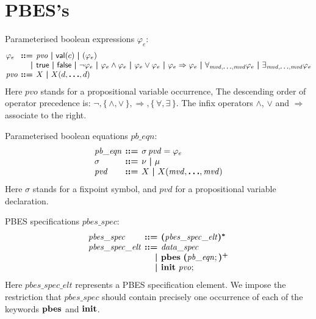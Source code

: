 \documentclass[a4paper,fleqn,10pt]{article}
\makeatletter
\newcommand{\f}[1]{\ensuremath{\mathit{#1}}}
\newenvironment{tightarray}[1]
  {\setlength{\arraycolsep}{2pt}%
   \begin{array}{@{}#1@{}}%
  }
  {\end{array}%
  }
\newcommand{\set}[1]{\ensuremath{\{\,#1\,\}}}
\newcommand{\limp}{\ensuremath{\Rightarrow}}
\newcommand{\mb}[1]{\text{\boldmath$#1$}}
\newcommand{\kwinit}{{\bf init}}
\newcommand{\kwpbes}{{\bf pbes}}
\makeatother
\begin{document}
\section{PBES's}

Parameterised boolean expressions $\varphi_e$:
\[\begin{tightarray}{lrl}
\varphi_e & \mb{::=} & \f{pvo}\ \mb{|}\
                       \mathsf{val}(c)\ \mb{|}\
                       ( \varphi_e )\\
          & \mb{|}   & \mathsf{true}\ \mb{|}\
                       \mathsf{false}\ \mb{|}\
                       \neg \varphi_e\ \mb{|}\
                       \varphi_e \land \varphi_e\ \mb{|}\
                       \varphi_e \lor \varphi_e\ \mb{|}\
                       \varphi_e \limp \varphi_e\ \mb{|}\
                       \forall_{\f{mvd},\mb{\ldots},\f{mvd}} \varphi_e\ \mb{|}\
                       \exists_{\f{mvd},\mb{\ldots},\f{mvd}} \varphi_e\\
\f{pvo}  & \mb{::=} & X\ \mb{|}\ X(d,\mb{\ldots},d)\\
\end{tightarray}\]
Here $\f{pvo}$ stands for a propositional variable occurrence,
The descending order of operator precedence is: $\neg, \set{\land, \lor}, \limp, \set{\forall, \exists}$.
The infix operators $\land$, $\lor$ and $\limp$ associate to the right.

Parameterised boolean equations $\f{pb\_eqn}$:
\[\begin{tightarray}{lrl}
\f{pb\_eqn} & \mb{::=} & \sigma\,\f{pvd} = \varphi_e\\
\sigma      & \mb{::=} & \nu\ \mb{|}\ \mu\\
\f{pvd}     & \mb{::=} & X\ \mb{|}\ X(\f{mvd},\mb{\ldots},\f{mvd})\\
\end{tightarray}\]
Here $\sigma$ stands for a fixpoint symbol, and $\f{pvd}$ for a propositional variable declaration.

PBES specifications $\f{pbes\_spec}$:
\[\begin{tightarray}{lrl}
\f{pbes\_spec}      & \mb{::=} & \mb{(}\f{pbes\_spec\_elt}\mb{)^{*}}\\
\f{pbes\_spec\_elt} & \mb{::=} & \f{data\_spec}\\
                    & \mb{|} & \kwpbes\ \mb{(}\f{pb\_eqn};\mb{)^{+}}\\
                    & \mb{|} & \kwinit\ \f{pvo};
\end{tightarray}\]
Here $\f{pbes\_spec\_elt}$ represents a PBES specification element. We impose the restriction that $\f{pbes\_spec}$ should contain precisely one occurrence of each of the keywords $\kwpbes$ and $\kwinit$.
\end{document}
